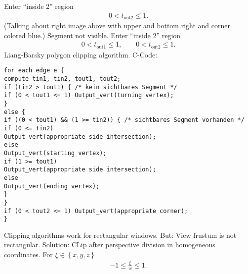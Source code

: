 \begin{compactdesc}
Enter ``inside 2'' region
\begin{gather*}
	0<t_{\text{out}2}\leq 1.
\end{gather*}
(Talking about right image above with upper and bottom right and corner colored blue.)
Segment not visible. Enter ``inside 2'' region
\begin{gather*}
	0<t_{\text{out}1}\leq 1,\qquad 0<t_{\text{out}2}\leq 1.
\end{gather*}
Liang-Barsky polygon clipping algorithm. C-Code:
\begin{lstlisting}
for each edge e {
compute tin1, tin2, tout1, tout2;
if (tin2 > tout1) { /* kein sichtbares Segment */
if (0 < tout1 <= 1) Output_vert(turning vertex);
}
else {
if ((0 < tout1) && (1 >= tin2)) { /* sichtbares Segment vorhanden */
if (0 <= tin2)
Output_vert(appropriate side intersection);
else
Output_vert(starting vertex);
if (1 >= tout1)
Output_vert(appropriate side intersection);
else
Output_vert(ending vertex);
}
}
if (0 < tout2 <= 1) Output_vert(appropriate corner);
}
\end{lstlisting}
\item[\lp{3D clipping}] Clipping algorithms work for rectangular windows. But: View frustum is not rectangular. Solution: CLip after perspective division in homogeneous coordinates.
	For $\xi\in\left\{ x,y,z \right\}$
	\begin{gather*}
		-1\leq \frac{\xi}{w}\leq 1.
	\end{gather*}
\end{compactdesc}
